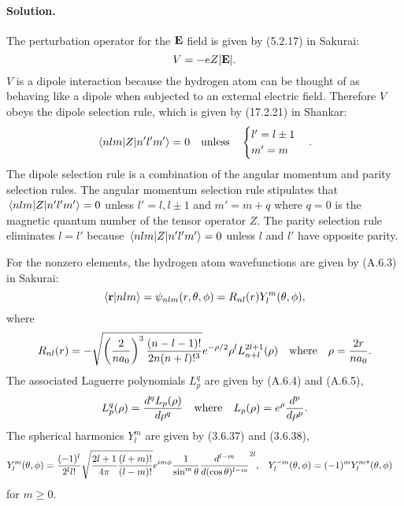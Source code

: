 \documentclass[11pt]{article}
\newcommand{\beq}{\begin{equation*}}
\newcommand{\eeq}{\end{equation*}}
\newcommand{\beqn}{\begin{equation}}
\newcommand{\eeqn}{\end{equation}}
\newenvironment{solution}
{
    \paragraph{Solution.}
    \ignorespaces
}
{
}
\begin{document}
\begin{solution}
	The perturbation operator for the $\mathbf{E}$ field is given by (5.2.17) in Sakurai:
	\beq
		V = -e Z |\vE|.
	\eeq
	$V$ is a dipole interaction because the hydrogen atom can be thought of as behaving like a dipole when subjected to an external electric field.  Therefore $V$ obeys the dipole selection rule, which is given by (17.2.21) in Shankar:
	\beq
		\mel{n l m}{Z}{n' l' m'} = 0 \qq{unless} \begin{cases} l' = l \pm 1 \\ m' = m \end{cases}.
	\eeq
	The dipole selection rule is a combination of the angular momentum and parity selection rules.  The angular momentum selection rule stipulates that $\mel{n l m}{Z}{n' l' m'} = 0$ unless $l' = l, l \pm 1$ and $m' = m + q$ where $q = 0$ is the magnetic quantum number of the tensor operator $Z$.  The parity selection rule eliminates $l = l'$ because $\mel{n l m}{Z}{n' l' m'} = 0$ unless $l$ and $l'$ have opposite parity.
	
	For the nonzero elements, the hydrogen atom wavefunctions are given by (A.6.3) in Sakurai:
	\beq
		\braket{\vr}{n l m} = \psi_{n l m}(r, \tht, \phi) = R_{n l}(r) Y_l^m(\tht, \phi),
	\eeq
	where
	\beqn \label{R}
		R_{n l}(r) = -\sqrt{\left( \frac{2}{n \ao} \right)^3 \frac{(n - l - 1)!}{2n (n + l)!^3}} e^{-\rho / 2} \rho^l L_{n + l}^{2l + 1}(\rho)
		\qq{where}
		\rho = \frac{2 r}{n \ao}.
	\eeqn
	The associated Laguerre polynomials $L_p^q$ are given by (A.6.4) and (A.6.5),
	\beqn \label{laguerre}
		L_p^q(\rho) = \dv[q]{L_p(\rho)}{\rho}
		\qq{where}
		L_p(\rho) = e^\rho \dv[p]{}{\rho} (\rho^p e^{-\rho}).
	\eeqn
	The spherical harmonics $Y_l^m$ are given by (3.6.37) and (3.6.38),
	\begin{align} \label{harm}
		Y_l^m(\theta, \phi) &= \frac{(-1)^l}{2^l l!} \sqrt{\frac{2l + 1}{4\pi} \frac{(l + m)!}{(l - m)!}} e^{i m \phi} \frac{1}{\sin^m{\theta}} \dv[{l - m}]{}{(\cos\theta)} (\sin\theta)^{2l}, &
		Y_l^{-m}(\theta, \phi) &= (-1)^m {Y_l^m}^*(\theta, \phi)
	\end{align}
	for $m \geq 0$.
	

\end{solution}
\end{document}
